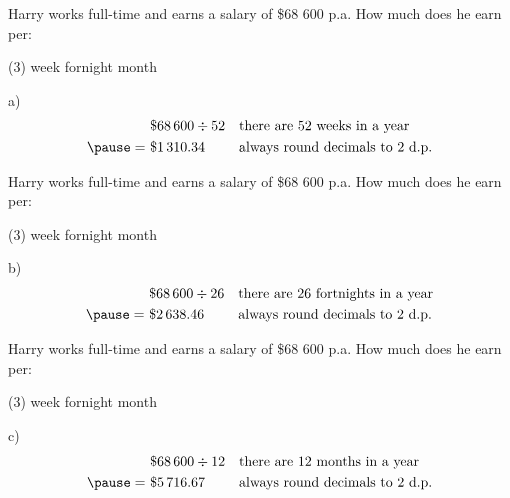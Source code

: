 \documentclass[aspectratio=169,10pt]{beamer}
\begin{document}
\begin{frame}
  \begin{example}
    Harry works full-time and earns a salary of \$68 600 p.a. How much does he earn per:
    \begin{tasks}(3)
      \task week
      \task fornight
      \task month
    \end{tasks}
  \end{example}\pause
  \begin{solution}
    a) \[\begin{aligned}
      &\  \$68\,600\div 52 && \text{there are 52 weeks in a year}\\\pause
      =&\ \$1\,310.34 && \text{always round decimals to 2 d.p.}
    \end{aligned}\]
  \end{solution}
\end{frame}
\addtocounter{example}{-1}
\begin{frame}
  \begin{example}
    Harry works full-time and earns a salary of \$68 600 p.a. How much does he earn per:
    \begin{tasks}(3)
      \task week
      \task fornight
      \task month
    \end{tasks}
  \end{example}
  \begin{solution}
    b) \[\begin{aligned}
      &\  \$68\,600\div 26 && \text{there are 26 fortnights in a year}\\\pause
      =&\ \$2\,638.46 && \text{always round decimals to 2 d.p.}
    \end{aligned}\]
  \end{solution}
\end{frame}
\addtocounter{example}{-1}
\begin{frame}
  \begin{example}
    Harry works full-time and earns a salary of \$68 600 p.a. How much does he earn per:
    \begin{tasks}(3)
      \task week
      \task fornight
      \task month
    \end{tasks}
  \end{example}
  \begin{solution}
    c) \[\begin{aligned}
      &\  \$68\,600\div 12 && \text{there are 12 months in a year}\\\pause
      =&\ \$5\,716.67 && \text{always round decimals to 2 d.p.}
    \end{aligned}\]
  \end{solution}
\end{frame}
\end{document}
